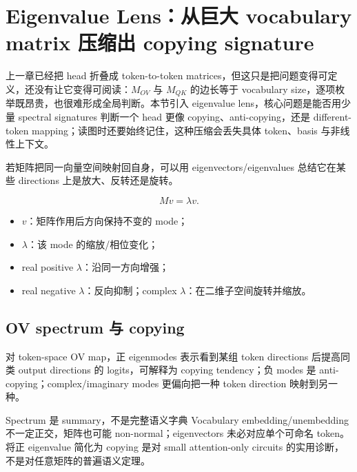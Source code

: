 \section{Eigenvalue Lens：从巨大 vocabulary matrix 压缩出 copying signature}

上一章已经把 head 折叠成 token-to-token matrices，但这只是把问题变得可定义，还没有让它变得可阅读：$M_{OV}$ 与 $M_{QK}$ 的边长等于 vocabulary size，逐项枚举既昂贵，也很难形成全局判断。本节引入 eigenvalue lens，核心问题是能否用少量 spectral signatures 判断一个 head 更像 copying、anti-copying，还是 different-token mapping；读图时还要始终记住，这种压缩会丢失具体 token、basis 与非线性上下文。

若矩阵把同一向量空间映射回自身，可以用 eigenvectors/eigenvalues 总结它在某些 directions 上是放大、反转还是旋转。


\[
Mv=\lambda v.
\]

\begin{itemize}
  \item $v$：矩阵作用后方向保持不变的 mode；
  \item $\lambda$：该 mode 的缩放/相位变化；
  \item real positive $\lambda$：沿同一方向增强；
  \item real negative $\lambda$：反向抑制；complex $\lambda$：在二维子空间旋转并缩放。
\end{itemize}


\subsection{OV spectrum 与 copying}

对 token-space OV map，正 eigenmodes 表示看到某组 token directions 后提高同类 output directions 的 logits，可解释为 copying tendency；负 modes 是 anti-copying；complex/imaginary modes 更偏向把一种 token direction 映射到另一种。


\begin{warningbox}{Spectrum 是 summary，不是完整语义字典}
Vocabulary embedding/unembedding 不一定正交，矩阵也可能 non-normal；eigenvectors 未必对应单个可命名 token。将正 eigenvalue 简化为 copying 是对 small attention-only circuits 的实用诊断，不是对任意矩阵的普遍语义定理。
\end{warningbox}

